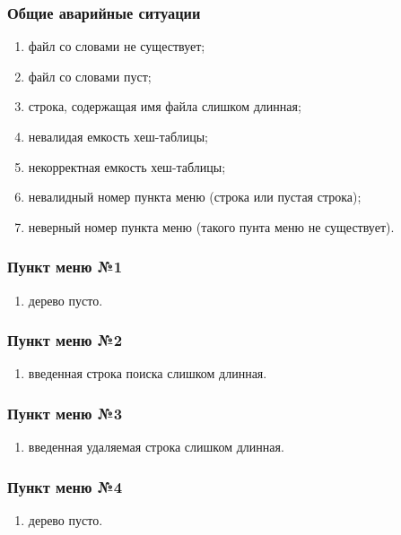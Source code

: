 \documentclass[a4paper,12pt]{extarticle}
\begin{document}
\subsubsection{Общие аварийные ситуации}
\begin{enumerate}
	\item файл со словами не существует;
	\item файл со словами пуст;
	\item строка, содержащая имя файла слишком длинная;
	\item невалидая емкость хеш-таблицы;
	\item некорректная емкость хеш-таблицы;
    \item невалидный номер пункта меню (строка или пустая строка);
    \item неверный номер пункта меню (такого пунта меню не существует).
\end{enumerate}

\subsubsection{Пункт меню №1}
\begin{enumerate}
    \item дерево пусто.
\end{enumerate}

\subsubsection{Пункт меню №2}
\begin{enumerate}
    \item введенная строка поиска слишком длинная.
\end{enumerate}

\subsubsection{Пункт меню №3}
\begin{enumerate}
    \item введенная удаляемая строка слишком длинная.
\end{enumerate}

\subsubsection{Пункт меню №4}
\begin{enumerate}
    \item дерево пусто.
\end{enumerate}
\end{document}
